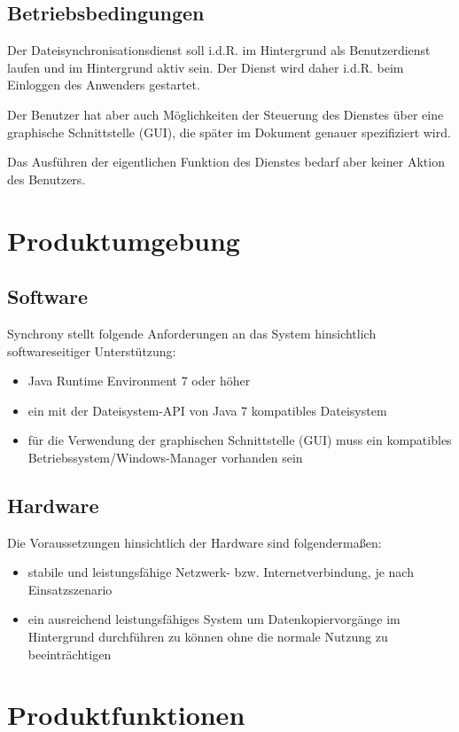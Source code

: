 \documentclass[12pt,oneside,a4paper,bibtotoc,liststotoc,pointlessnumbers]{scrartcl}
\begin{document}
\subsection{Betriebsbedingungen}
Der Dateisynchronisationsdienst soll i.d.R. im Hintergrund als Benutzerdienst laufen und im Hintergrund aktiv sein. Der Dienst wird daher i.d.R. beim Einloggen des Anwenders gestartet.\par
Der Benutzer hat aber auch Möglichkeiten der Steuerung des Dienstes über eine graphische Schnittstelle (GUI), die später im Dokument genauer spezifiziert wird.\par
Das Ausführen der eigentlichen Funktion des Dienstes bedarf aber keiner Aktion des Benutzers.

\newpage
\section{Produktumgebung}
\subsection{Software}
Synchrony stellt folgende Anforderungen an das System hinsichtlich softwareseitiger Unterstützung:
\begin{itemize}
	\item Java Runtime Environment 7 oder höher
	\item ein mit der Dateisystem-API von Java 7 kompatibles Dateisystem
	\item für die Verwendung der graphischen Schnittstelle (GUI) muss ein kompatibles Betriebssystem/Windows-Manager vorhanden sein
\end{itemize}
\subsection{Hardware}
Die Voraussetzungen hinsichtlich der Hardware sind folgendermaßen:
\begin{itemize}
	\item stabile und leistungsfähige Netzwerk- bzw. Internetverbindung, je nach Einsatzszenario
	\item ein ausreichend leistungsfähiges System um Datenkopiervorgänge im Hintergrund durchführen zu können ohne die normale Nutzung zu beeinträchtigen
\end{itemize}
\newpage
\section{Produktfunktionen}
\end{document}
